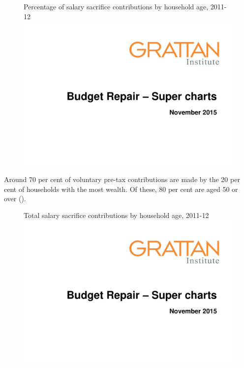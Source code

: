 \begin{subappendices}
\begin{figure}
%
{Percentage of salary sacrifice contributions by household age, 2011-12}\label{fig:SUPER-A-3}
\includegraphics[width=\columnwidth,page=37]{super-atlas/PPTX.pdf}

\end{figure}

Around 70 per cent of voluntary pre-tax contributions are made by the 20 per cent of households with the most wealth. Of these, 80 per cent are aged 50 or over (). 

\begin{figure}
%
{Total salary sacrifice contributions by household age, 2011-12}\label{fig:SUPER-A-4}
\includegraphics[width=\columnwidth,page=38]{super-atlas/PPTX.pdf}


\end{figure}
\end{subappendices}
